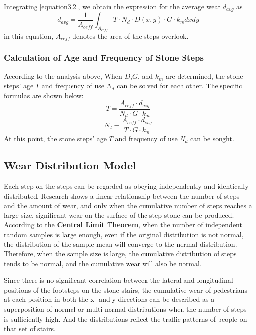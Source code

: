 \documentclass[12pt]{article}  %
\numberwithin{equation}{section} %
\begin{document}
Integrating \autoref{equation3.2}, we obtain the expression for the average wear $d_{avg}$ as
\begin{equation}
    d_{avg} = \frac{1}{A_{ceff}}\int_{A_{ceff}} T\cdot{N_d}\cdot{D(x,y)}\cdot{G}\cdot{k_m}dxdy
\end{equation}
in this equation, $A_{ceff}$ denotes the area of the steps overlook.

\subsubsection{Calculation of Age and Frequency of Stone Steps}
According to the analysis above, When $D$,$G$, and $k_m$ are determined,  the stone steps' age $T$ and frequency of use $N_d$ can be solved for each other. The specific formulas are shown below:
\begin{equation}
    T = \frac{A_{ceff}\cdot{d_{avg}}}{N_d\cdot{G}\cdot{k_m}}
\end{equation}
\begin{equation}
    N_d = \frac{A_{ceff}\cdot{d_{avg}}}{T\cdot{G}\cdot{k_m}}
\end{equation}
At this point, the stone steps' age $T$ and frequency of use $N_d$ can be sought.

\subsection{Wear Distribution Model}
Each step on the steps can be regarded as obeying independently and identically distributed. Research shows a linear relationship between the number of steps and the amount of wear, and only when the cumulative number of steps reaches a large size, significant wear on the surface of the step stone can be produced.  According to the \textbf{Central Limit Theorem}, when the number of independent random samples is large enough, even if the original distribution is not normal, the distribution of the sample mean will converge to the normal distribution. Therefore, when the sample size is large, the cumulative distribution of steps tends to be normal, and the cumulative wear will also be normal.

Since there is no significant correlation between the lateral and longitudinal positions of the footsteps on the stone stairs, the cumulative wear of pedestrians at each position in both the x- and y-directions can be described as a superposition of normal or multi-normal distributions when the number of steps is sufficiently high. And the distributions reflect the traffic patterns of people on that set of stairs.
\end{document}
